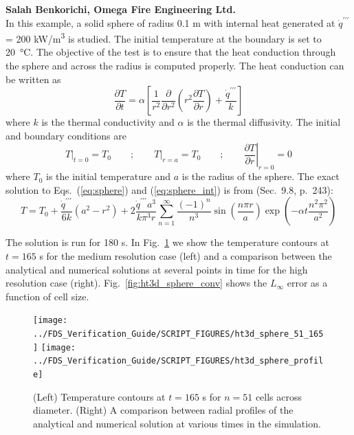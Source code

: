 \documentclass[11pt]{book}
\begin{document}
\textbf{Salah Benkorichi, Omega Fire Engineering Ltd.}\\

In this example, a solid sphere of radius 0.1 m with internal heat generated at $\dot{q}^{\prime\prime\prime}$ = 200 \si{kW/m^3} is studied. The initial temperature at the boundary is set to \SI{20}{\degreeCelsius}. The objective of the test is to ensure that the heat conduction through the sphere and across the radius is computed properly. The heat conduction can be written as
\begin{equation}
\label{eq:sphere}
\frac{\partial T}{\partial t} = \alpha \left[ \frac{1}{r^2} \frac{\partial}{\partial r^2} \left( r^2 \frac{\partial T}{\partial r} \right) + \frac{\dot{q}^{\prime\prime\prime}}{k} \right]
\end{equation}
where $k$ is the thermal conductivity and $\alpha$ is the thermal diffusivity.  The initial and boundary conditions are
\begin{equation}
\label{eq:sphere_int}
\left. T  \right|_{t=0} =T_0 \qquad; \qquad \left. T \right|_{r=a} = T_0 \qquad; \qquad \left. \frac{\partial T}{\partial r} \right|_{r=0}=0
\end{equation}
where $T_0$ is the initial temperature and $a$ is the radius of the sphere. The exact solution to Eqs.~(\ref{eq:sphere}) and (\ref{eq:sphere_int}) is from \cite{Carslaw:1} (Sec.~9.8, p.~243):
\begin{equation}
\label{eq:sphere_sol}
T = T_0 + \frac{\dot{q}^{\prime\prime\prime}}{6k} \left ( a^2 - r^2 \right ) + 2 \frac{\dot{q}^{\prime\prime\prime}a^3}{k\pi^3 r} \sum\limits_{n=1}^\infty \frac{(-1)^n}{n^3}\sin \left(\frac{n\pi r}{a}\right)\exp \left( -\alpha t \frac{n^2 \pi^2}{a^2} \right)
\end{equation}

The solution is run for 180 s. In Fig.~\ref{fig:ht3d_sphere_time} we show the temperature contours at $t=165$ s for the medium resolution case (left) and a comparison between the analytical and numerical solutions at several points in time for the high resolution case (right). Fig.~\ref{fig:ht3d_sphere_conv} shows the $L_\infty$ error as a function of cell size.

\begin{figure}[ht]
\centering
\texttt{[image: ../FDS\_Verification\_Guide/SCRIPT\_FIGURES/ht3d\_sphere\_51\_165]}
\texttt{[image: ../FDS\_Verification\_Guide/SCRIPT\_FIGURES/ht3d\_sphere\_profile]}
\caption[The  profiles]{(Left) Temperature contours at $t = 165$ s for $n=51$ cells across diameter. (Right) A comparison between radial profiles of the analytical and numerical solution at various times in the simulation.}
\label{fig:ht3d_sphere_time}
\end{figure}
\end{document}
